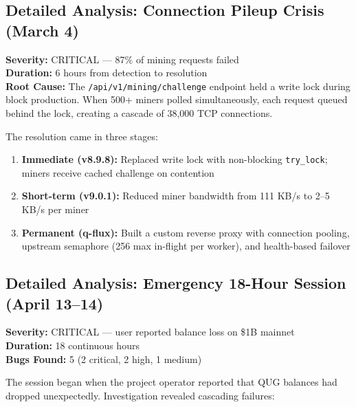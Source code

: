 \documentclass[12pt,a4paper]{article}
\begin{document}
\subsection{Detailed Analysis: Connection Pileup Crisis (March 4)}

\begin{crisisbox}
\textbf{Severity:} CRITICAL --- 87\% of mining requests failed\\
\textbf{Duration:} 6 hours from detection to resolution\\
\textbf{Root Cause:} The \texttt{/api/v1/mining/challenge} endpoint held a write lock during block production. When 500+ miners polled simultaneously, each request queued behind the lock, creating a cascade of 38{,}000 TCP connections.
\end{crisisbox}

The resolution came in three stages:
\begin{enumerate}
    \item \textbf{Immediate (v8.9.8):} Replaced write lock with non-blocking \texttt{try\_lock}; miners receive cached challenge on contention
    \item \textbf{Short-term (v9.0.1):} Reduced miner bandwidth from 111 KB/s to 2--5 KB/s per miner
    \item \textbf{Permanent (q-flux):} Built a custom reverse proxy with connection pooling, upstream semaphore (256 max in-flight per worker), and health-based failover
\end{enumerate}

\subsection{Detailed Analysis: Emergency 18-Hour Session (April 13--14)}

\begin{crisisbox}
\textbf{Severity:} CRITICAL --- user reported balance loss on \$1B mainnet\\
\textbf{Duration:} 18 continuous hours\\
\textbf{Bugs Found:} 5 (2 critical, 2 high, 1 medium)
\end{crisisbox}

The session began when the project operator reported that QUG balances had dropped unexpectedly. Investigation revealed cascading failures:
\end{document}

